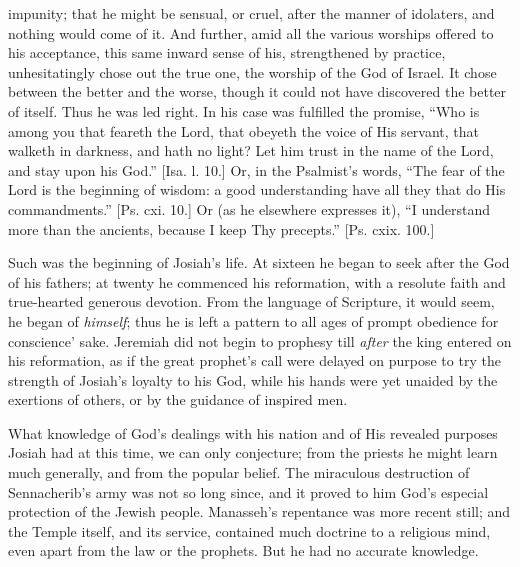 impunity; that he might be sensual, or cruel, after the manner of
idolaters, and nothing would come of it. And further, amid all the
various worships offered to his acceptance, this same inward sense of
his, strengthened by practice, unhesitatingly chose out the true one,
the worship of the God of Israel. It chose between the better and the
worse, though it could not have discovered the better of itself. Thus
he was led right. In his case was fulfilled the promise, ``Who is
among you that feareth the Lord, that obeyeth the voice of His
servant, that walketh in darkness, and hath no light? Let him trust in
the name of the Lord, and stay upon his God.'' [Isa. l. 10.] Or,
in the Psalmist's words, ``The fear of the Lord is the beginning
of wisdom: a good understanding have all they that do His
commandments.'' [Ps. cxi. 10.] Or (as he elsewhere expresses it),
``I understand more than the ancients, because I keep Thy
precepts.'' [Ps. cxix. 100.]

Such was the beginning of Josiah's life. At sixteen he began to
seek after the God of his fathers; at twenty he commenced his
reformation, with a resolute faith and true-hearted generous devotion.
From the language of Scripture, it would seem, he began of \emph{himself};
thus he is left a pattern to all ages of prompt obedience for
conscience' sake. Jeremiah did not begin to prophesy till \emph{after}
the king entered on his reformation, as if the great prophet's call
were delayed on purpose to try the strength of Josiah's loyalty to his
God, while his hands were yet unaided by the exertions of others, or
by the guidance of inspired men.

What knowledge of God's dealings with his nation and of His
revealed purposes Josiah had at this time, we can only conjecture;
from the priests he might learn much generally, and from the popular
belief. The miraculous destruction of Sennacherib's army was not so
long since, and it proved to him God's especial protection of the
Jewish people. Manasseh's repentance was more recent still; and the
Temple itself, and its service, contained much doctrine to a religious
mind, even apart from the law or the prophets. But he had no accurate
knowledge.

